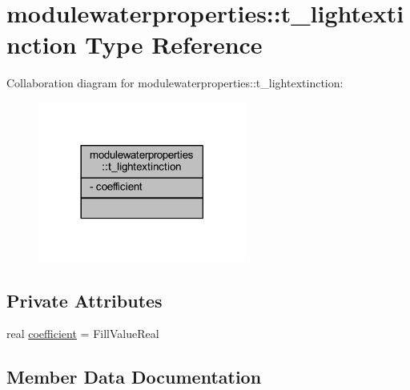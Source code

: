 \hypertarget{structmodulewaterproperties_1_1t__lightextinction}{}\section{modulewaterproperties\+:\+:t\+\_\+lightextinction Type Reference}
\label{structmodulewaterproperties_1_1t__lightextinction}


Collaboration diagram for modulewaterproperties\+:\+:t\+\_\+lightextinction\+:\nopagebreak
\begin{figure}[H]
\begin{center}
\leavevmode
\includegraphics[width=194pt]{structmodulewaterproperties_1_1t__lightextinction__coll__graph}
\end{center}
\end{figure}
\subsection*{Private Attributes}
\begin{DoxyCompactItemize}
\item 
real \mbox{\hyperlink{structmodulewaterproperties_1_1t__lightextinction_aa5b9deccfdda246e1bbd4e000f20cdf8}{coefficient}} = Fill\+Value\+Real
\end{DoxyCompactItemize}


\subsection{Member Data Documentation}
\mbox{\label{structmodulewaterproperties_1_1t__lightextinction_aa5b9deccfdda246e1bbd4e000f20cdf8}} 
